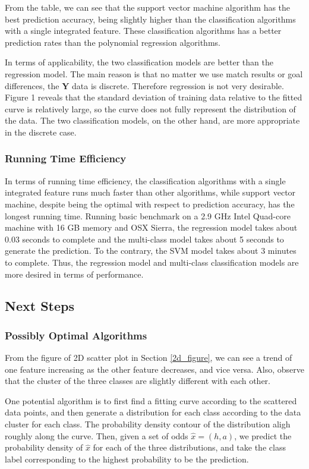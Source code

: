 \documentclass{article}
\begin{document}
From the table, we can see that the support vector machine algorithm has the best prediction accuracy, being slightly higher than the classification algorithms with a single integrated feature. These classification algorithms has a better prediction rates than the polynomial regression algorithms.

In terms of applicability, the two classification models are better than the regression model. The main reason is that no matter we use match results or goal differences, the $\mathbf{Y}$ data is discrete. Therefore regression is not very desirable. Figure 1 reveals that the standard deviation of training data relative to the fitted curve is relatively large, so the curve does not fully represent the distribution of the data. The two classification models, on the other hand, are more appropriate in the discrete case.

\subsubsection{Running Time Efficiency}
In terms of running time efficiency, the classification algorithms with a single integrated feature runs much faster than other algorithms, while support vector machine, despite being the optimal with respect to prediction accuracy, has the longest running time. Running basic benchmark on a 2.9 GHz Intel Quad-core machine with 16 GB memory and OSX Sierra, the regression model takes about 0.03 seconds to complete and the multi-class model takes about 5 seconds to generate the prediction. To the contrary, the SVM model takes about 3 minutes to complete. Thus, the regression model and multi-class classification models are more desired in terms of performance.

\subsection{Next Steps}
\subsubsection{Possibly Optimal Algorithms}

From the figure of 2D scatter plot in Section \ref{2d_figure}, we can see a trend of one feature increasing as the other feature decreases, and vice versa. Also, observe that the cluster of the three classes are slightly different with each other.

One potential algorithm is to first find a fitting curve according to the scattered data points, and then generate a distribution for each class according to the data cluster for each class. The probability density contour of the distribution aligh roughly along the curve. Then, given a set of odds $\hat{x} = (h, a)$, we predict the probability density of $\hat{x}$ for each of the three distributions, and take the class label corresponding to the highest probability to be the prediction.
\end{document}
